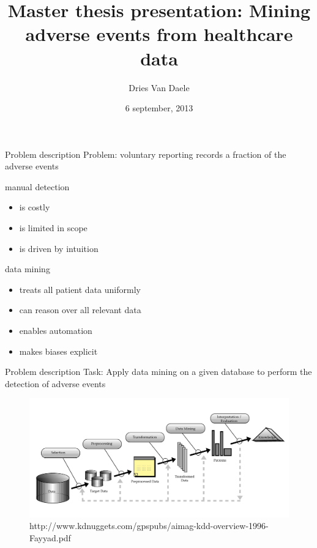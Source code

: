 \documentclass{beamer}
\title[Master thesis presentation: Mining adverse events from healthcare data]
{Master thesis presentation: Mining adverse events from healthcare data}
\author[Dries Van Daele]{Dries Van Daele}
\institute{KU Leuven, DTAI}
\date{6 september, 2013}
\begin{document}
\begin{frame}{}
  \titlepage
\end{frame}

\begin{frame}{Problem description}
Problem: voluntary reporting records a fraction of the adverse events\vspace{3 mm}


manual detection
\begin{itemize}
\item is costly
\item is limited in scope
\item is driven by intuition
\end{itemize}
data mining
\begin{itemize}
\item treats all patient data uniformly
\item can reason over all relevant data
\item enables automation
\item makes biases explicit
\end{itemize}
\end{frame}


\begin{frame}{Problem description}
Task: Apply data mining on a given database to perform the detection of adverse events
\begin{figure}
\includegraphics[width=\textwidth,height=.88\textheight,keepaspectratio]{kdd}
{\footnotesize \caption{http://www.kdnuggets.com/gpspubs/aimag-kdd-overview-1996-Fayyad.pdf}}
\end{figure}

\end{frame}


\end{document}
